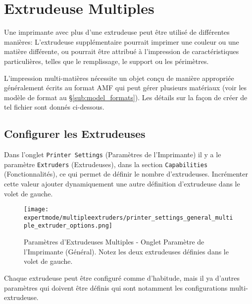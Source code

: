 
\section{Extrudeuse Multiples} %
\label{sec:multiple_extruders}

Une imprimante avec plus d'une extrudeuse peut \^etre utilis\'e de diff\'erentes mani\`eres: L'extrudeuse suppl\'ementaire pourrait imprimer une couleur ou une mati\`ere diff\'erente, ou pourrait \^etre attribu\'e \`a l'impression de caract\'eristiques particuli\`eres, telles que le remplissage, le support ou les p\'erim\`etres.

L'impression multi-mati\`eres n\'ecessite un objet conçu de mani\`ere appropri\'ee g\'en\'eralement \'ecrits au format AMF qui peut g\'erer plusieurs mat\'eriaux (voir les mod\`ele de format au §\ref{sub:model_formats}).  Les d\'etails sur la façon de cr\'eer de tel fichier sont donn\'es ci-dessous.


\subsection{Configurer les Extrudeuses} %
\label{sub:configuring_extruders}

Dans l'onglet \texttt{Printer Settings} (Param\`etres de l'Imprimante) il y a le param\`etre \texttt{Extruders} (Extrudeuses), dans la section \texttt{Capabilities} (Fonctionnalit\'es), ce qui permet de d\'efinir le nombre d'extrudeuses. Incr\'ementer cette valeur ajouter dynamiquement une autre d\'efinition d'extrudeuse dans le volet de gauche.

\begin{figure}[H]
\centering
\texttt{[image: expertmode/multipleextruders/printer\_settings\_general\_multiple\_extruder\_options.png]}
\caption{Param\`etres d'Extrudeuses Multiples - Onglet Param\`etre de l'Imprimante (G\'en\'eral).  Notez les deux extrudeuses d\'efinies dans le volet de gauche.}
\label{fig:printer_settings_general_multiple_extruder_options}
\end{figure}

Chaque extrudeuse peut \^etre configur\'e comme d'habitude, mais il ya d'autres param\`etres qui doivent \^etre d\'efinis qui sont notamment les configurations multi-extrudeuse.

